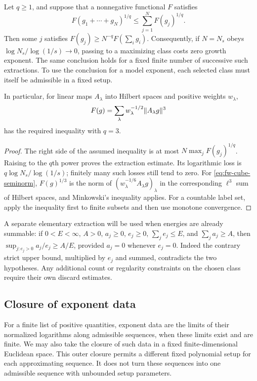 \begin{lemma}
\label{lem:fw-finite-extraction}
Let $q\ge1$, and suppose that a nonnegative functional $F$ satisfies
\[
 F(g_1+\cdots+g_N)^{1/q}
 \le\sum_{j=1}^N F(g_j)^{1/q}.
\]
Then some $j$ satisfies $F(g_j)\ge N^{-q}F(\sum_i g_i)$.
Consequently, if $N=N_s$ obeys
$\log N_s/\log(1/s)\to0$, passing to a maximizing class costs zero
growth exponent.  The same conclusion holds for a fixed finite
number of successive such extractions.  To use the conclusion for
a model exponent, each selected class must itself be admissible in
a fixed setup.

In particular, for linear maps $A_\lambda$ into Hilbert spaces and
positive weights $w_\lambda$,
\begin{equation}\label{eq:fw-cube-seminorm}
 F(g)=\sum_\lambda w_\lambda^{-1/2}\lVert A_\lambda g\rVert^3
\end{equation}
has the required inequality with $q=3$.
\end{lemma}

\begin{proof}
The right side of the assumed inequality is at most
$N\max_jF(g_j)^{1/q}$.  Raising to the $q$th power proves the
extraction estimate.  Its logarithmic loss is
$q\log N_s/\log(1/s)$; finitely many such losses still tend to zero.
For \eqref{eq:fw-cube-seminorm}, $F(g)^{1/3}$ is the norm of
$(w_\lambda^{-1/6}A_\lambda g)_\lambda$ in the corresponding
$\ell^3$ sum of Hilbert spaces, and Minkowski's inequality applies.
For a countable label set, apply the inequality first to finite
subsets and then use monotone convergence.
\end{proof}

A separate elementary extraction will be used when energies are
already summable: if $0<E<\infty$, $A>0$, $a_j\ge0$, $e_j\ge0$,
$\sum_j e_j\le E$, and $\sum_j a_j\ge A$, then
$\sup_{j:e_j>0}a_j/e_j\ge A/E$, provided $a_j=0$ whenever $e_j=0$.
Indeed the contrary strict upper bound, multiplied by $e_j$ and
summed, contradicts the two hypotheses.  Any additional count or
regularity constraints on the chosen class require their own
discard estimates.

\subsection{Closure of exponent data}

For a finite list of positive quantities, exponent data are the limits
of their normalized logarithms along admissible sequences, when these
limits exist and are finite.  We may also take the closure of such data
in a fixed finite-dimensional Euclidean space.  This outer closure
permits a different fixed polynomial setup for each approximating
sequence.  It does not turn these sequences into one admissible
sequence with unbounded setup parameters.

